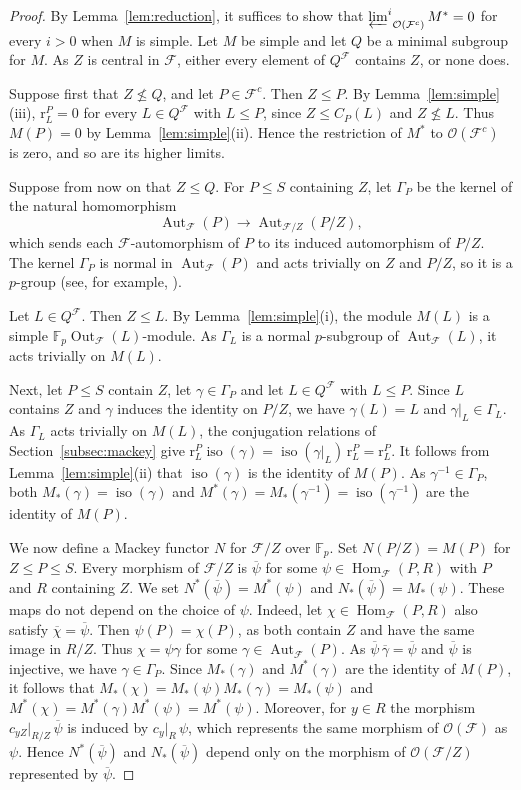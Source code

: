\documentclass[10pt]{amsart}
\theoremstyle{definition}
\DeclareMathOperator{\Aut}{Aut}
\DeclareMathOperator{\Out}{Out}
\DeclareMathOperator{\Hom}{Hom}
\numberwithin{equation}{section}
\renewcommand{\le}{\leqslant}
\newcommand{\F}{\mathcal F}
\newcommand{\Op}{\mathcal O}
\newcommand{\limi}[2]{\mathop{\varprojlim\nolimits^{#1}}_{#2}}
\begin{document}
\begin{proof}
By Lemma~\ref{lem:reduction}, it suffices to show that $\limi{i}{\Op(\F^c)}M^*=0$ for every $i>0$ when $M$ is simple.
Let $M$ be simple and let $Q$ be a minimal subgroup for $M$.
As $Z$ is central in $\F$, either every element of $Q^\F$ contains $Z$, or none does.

Suppose first that $Z\not\le Q$, and let $P\in\F^c$.
Then $Z\le P$.
By Lemma~\ref{lem:simple}(iii), $\mathrm{r}^P_L=0$ for every $L\in Q^\F$ with $L\le P$, since $Z\le C_P(L)$ and $Z\not\le L$.
Thus $M(P)=0$ by Lemma~\ref{lem:simple}(ii).
Hence the restriction of $M^*$ to $\Op(\F^c)$ is zero, and so are its higher limits.

Suppose from now on that $Z\le Q$.
For $P\le S$ containing $Z$, let $\Gamma_P$ be the kernel of the natural homomorphism
\[
\Aut_\F(P)\longrightarrow\Aut_{\F/Z}(P/Z),
\]
which sends each $\F$-automorphism of $P$ to its induced automorphism of $P/Z$.
The kernel $\Gamma_P$ is normal in $\Aut_\F(P)$ and acts trivially on $Z$ and $P/Z$, so it is a $p$-group (see, for example, \cite[Corollary~5.3.3]{Gorenstein}).

Let $L\in Q^\F$.
Then $Z\le L$.
By Lemma~\ref{lem:simple}(i), the module $M(L)$ is a simple $\mathbb{F}_p\Out_\F(L)$-module.
As $\Gamma_L$ is a normal $p$-subgroup of $\Aut_\F(L)$, it acts trivially on $M(L)$.

Next, let $P\le S$ contain $Z$, let $\gamma\in\Gamma_P$ and let $L\in Q^\F$ with $L\le P$.
Since $L$ contains $Z$ and $\gamma$ induces the identity on $P/Z$, we have $\gamma(L)=L$ and $\gamma|_L\in\Gamma_L$.
As $\Gamma_L$ acts trivially on $M(L)$, the conjugation relations of Section~\ref{subsec:mackey} give $\mathrm{r}^P_L\operatorname{iso}(\gamma)=\operatorname{iso}(\gamma|_L)\,\mathrm{r}^P_L=\mathrm{r}^P_L$.
It follows from Lemma~\ref{lem:simple}(ii) that $\operatorname{iso}(\gamma)$ is the identity of $M(P)$.
As $\gamma^{-1}\in\Gamma_P$, both $M_*(\gamma)=\operatorname{iso}(\gamma)$ and ${M^*(\gamma)=M_*(\gamma^{-1})=\operatorname{iso}(\gamma^{-1})}$ are the identity of $M(P)$.

We now define a Mackey functor $N$ for $\F/Z$ over $\mathbb{F}_p$.
Set $N(P/Z)=M(P)$ for $Z\le P\le S$.
Every morphism of $\F/Z$ is $\overline\psi$ for some $\psi\in\Hom_\F(P,R)$ with $P$ and $R$ containing $Z$.
We set $N^*(\overline\psi)=M^*(\psi)$ and $N_*(\overline\psi)=M_*(\psi)$.
These maps do not depend on the choice of $\psi$.
Indeed, let $\chi\in\Hom_\F(P,R)$ also satisfy $\overline\chi=\overline\psi$.
Then $\psi(P)=\chi(P)$, as both contain $Z$ and have the same image in $R/Z$.
Thus $\chi=\psi\gamma$ for some $\gamma\in\Aut_\F(P)$.
As $\overline\psi\,\overline\gamma=\overline\psi$ and $\overline\psi$ is injective, we have $\gamma\in\Gamma_P$.
Since $M_*(\gamma)$ and $M^*(\gamma)$ are the identity of $M(P)$, it follows that $M_*(\chi)=M_*(\psi)M_*(\gamma)=M_*(\psi)$ and $M^*(\chi)=M^*(\gamma)M^*(\psi)=M^*(\psi)$.
Moreover, for $y\in R$ the morphism $c_{yZ}|_{R/Z}\,\overline\psi$ is induced by $c_y|_R\,\psi$, which represents the same morphism of $\Op(\F)$ as $\psi$.
Hence $N^*(\overline\psi)$ and $N_*(\overline\psi)$ depend only on the morphism of $\Op(\F/Z)$ represented by $\overline\psi$.


\end{proof}
\end{document}
